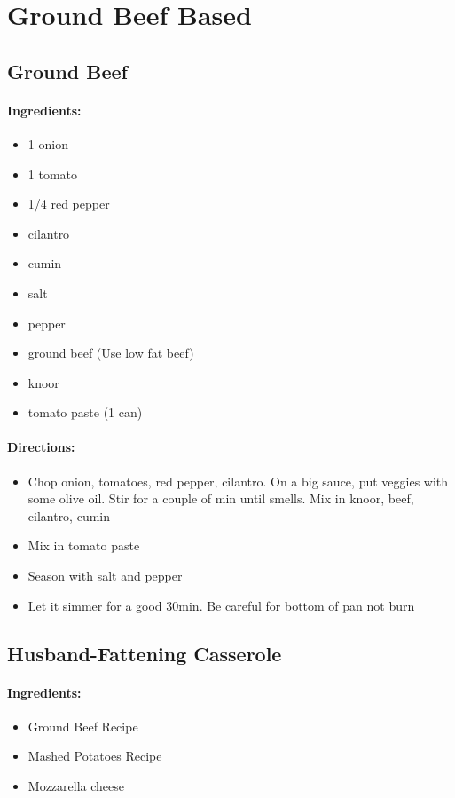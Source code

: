 \documentclass{article}
\begin{document}
\section{Ground Beef Based}


\subsection{Ground Beef}

\paragraph{Ingredients:}
\begin{itemize}
    \item 1 onion
    \item 1 tomato
    \item 1/4 red pepper
    \item cilantro
    \item cumin
    \item salt
    \item pepper
    \item ground beef (Use low fat beef)
    \item knoor
    \item tomato paste (1 can)
\end{itemize}

\paragraph{Directions:}
\begin{itemize}
    \item Chop onion, tomatoes, red pepper, cilantro. On a big sauce, put veggies with some olive oil. Stir for a couple of min until smells. Mix in knoor, beef, cilantro, cumin
    \item Mix in tomato paste
    \item Season with salt and pepper
    \item Let it simmer for a good 30min. Be careful for bottom of pan not burn
\end{itemize}

\subsection{Husband-Fattening Casserole}

\paragraph{Ingredients:}
\begin{itemize}
    \item Ground Beef Recipe
    \item Mashed Potatoes Recipe
    \item Mozzarella cheese
\end{itemize}
\end{document}

